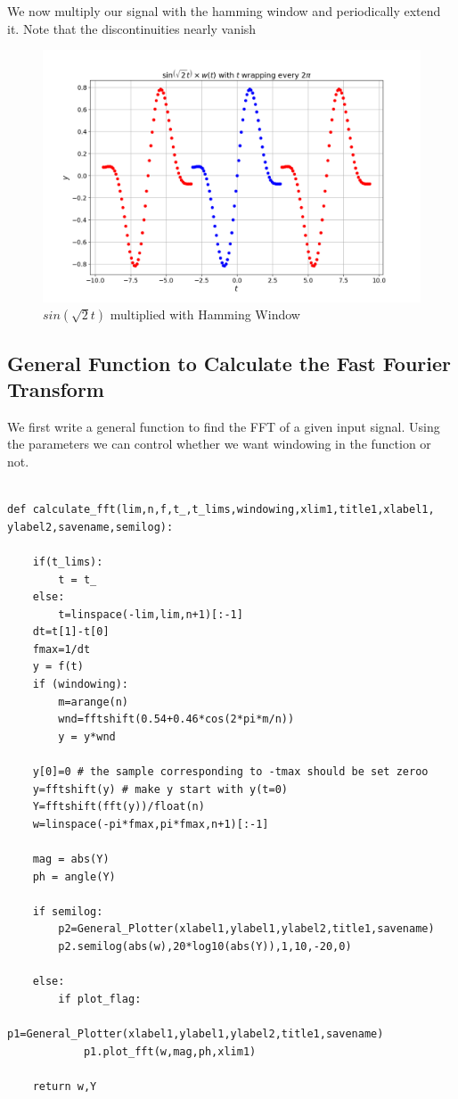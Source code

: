 \documentclass[11pt, a4paper]{article}
\begin{document}
\noindent
We now multiply our signal with the hamming window and periodically extend it. Note that the discontinuities nearly vanish
\begin{figure}[!tbh]
\centering
\includegraphics[scale=0.4]{plots/windowed_sin.png}
\caption{$sin(\sqrt{2}t)$ multiplied with Hamming Window}
\label{fig:5}
\end{figure}


\subsection{General Function to Calculate the Fast Fourier Transform}

We first write a general function to find the FFT of a given
input signal. Using the parameters we can control whether we want windowing in
the function or not.

\begin{lstlisting}

def calculate_fft(lim,n,f,t_,t_lims,windowing,xlim1,title1,xlabel1, ylabel2,savename,semilog):
    
    if(t_lims):
        t = t_
    else:
        t=linspace(-lim,lim,n+1)[:-1]
    dt=t[1]-t[0]
    fmax=1/dt
    y = f(t)
    if (windowing):
        m=arange(n)
        wnd=fftshift(0.54+0.46*cos(2*pi*m/n))
        y = y*wnd

    y[0]=0 # the sample corresponding to -tmax should be set zeroo
    y=fftshift(y) # make y start with y(t=0)
    Y=fftshift(fft(y))/float(n)
    w=linspace(-pi*fmax,pi*fmax,n+1)[:-1]
    
    mag = abs(Y)
    ph = angle(Y)
    
    if semilog:
        p2=General_Plotter(xlabel1,ylabel1,ylabel2,title1,savename)
        p2.semilog(abs(w),20*log10(abs(Y)),1,10,-20,0)

    else:
        if plot_flag:
            p1=General_Plotter(xlabel1,ylabel1,ylabel2,title1,savename)
            p1.plot_fft(w,mag,ph,xlim1)

    return w,Y

\end{lstlisting}
\end{document}
